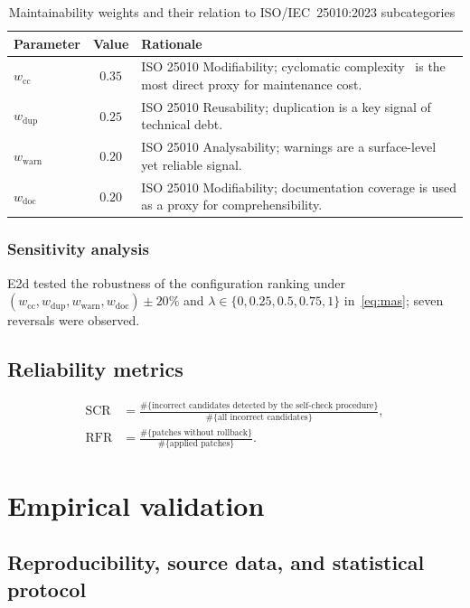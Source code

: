 \begin{table}[htbp]
\caption{Maintainability weights and their relation to ISO/IEC~25010:2023 subcategories~\cite{iso25010}}
\label{tab:weights}
\centering
\begin{tabularx}{\textwidth}{@{}lc>{\raggedright\arraybackslash}X@{}}
\toprule
Parameter & Value & Rationale \\
\midrule
$w_{\mathrm{cc}}$ & $0.35$ & ISO 25010 Modifiability; cyclomatic complexity~\cite{mccabe1976} is the most direct proxy for maintenance cost. \\
$w_{\mathrm{dup}}$ & $0.25$ & ISO 25010 Reusability; duplication is a key signal of technical debt. \\
$w_{\mathrm{warn}}$ & $0.20$ & ISO 25010 Analysability; warnings are a surface-level yet reliable signal. \\
$w_{\mathrm{doc}}$ & $0.20$ & ISO 25010 Modifiability; documentation coverage is used as a proxy for comprehensibility. \\
\bottomrule
\end{tabularx}
\end{table}

\subsubsection*{Sensitivity analysis}
E2d tested the robustness of the configuration ranking under $(w_{\mathrm{cc}},\allowbreak w_{\mathrm{dup}},\allowbreak w_{\mathrm{warn}},\allowbreak w_{\mathrm{doc}})\pm 20\%$ and $\lambda\in\{0,0.25,0.5,0.75,1\}$ in~\eqref{eq:mas}; seven reversals were observed.

\subsection{Reliability metrics}
\begin{align}
\mathrm{SCR}&=\frac{\#\{\text{incorrect candidates detected by the self-check procedure}\}}{\#\{\text{all incorrect candidates}\}},\\
\mathrm{RFR}&=\frac{\#\{\text{patches without rollback}\}}{\#\{\text{applied patches}\}}.
\end{align}

\section{Empirical validation}\label{sec:eval}

\subsection{Reproducibility, source data, and statistical protocol}\label{subsec:e1}

